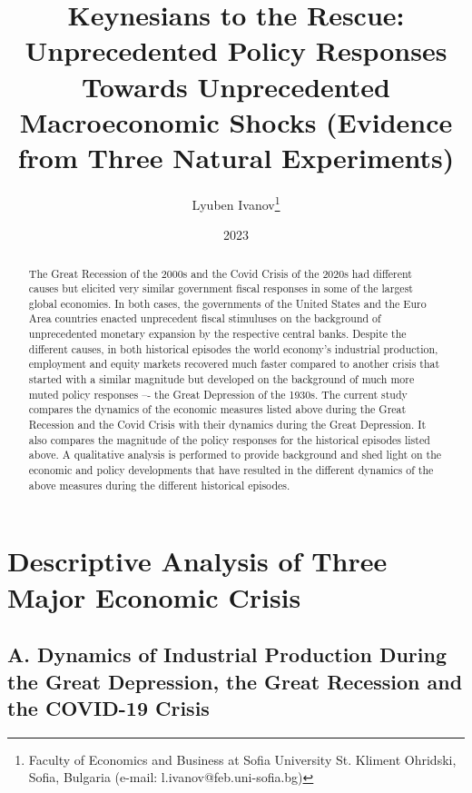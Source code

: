 \documentclass[AER]{AEA}
\begin{document}
\title{Keynesians to the Rescue: Unprecedented Policy Responses Towards Unprecedented Macroeconomic Shocks (Evidence from Three Natural Experiments)}
\author{Lyuben Ivanov\thanks{Faculty of Economics and Business at Sofia University St. Kliment Ohridski\dq, Sofia, Bulgaria (e-mail: l.ivanov@feb.uni-sofia.bg)}}
\date{2023}
\pubVolume{}
\pubIssue{}

\begin{abstract}
The Great Recession of the 2000s and the Covid Crisis of the 2020s had different causes but elicited very similar government fiscal responses in some of the largest global economies. In both cases, the governments of the United States and the Euro Area countries enacted unprecedent fiscal stimuluses on the background of unprecedented monetary expansion by the respective central banks. Despite the different causes, in both historical episodes the world economy’s industrial production, employment and equity markets recovered much faster compared to another crisis that started with a similar magnitude but developed on the background of much more muted policy responses –- the Great Depression of the 1930s.  The current study compares the dynamics of the economic measures listed above during the Great Recession and the Covid Crisis with their dynamics during the Great Depression. It also compares the magnitude of the policy responses for the historical episodes listed above. A qualitative analysis is performed to provide background and shed light on the economic and policy developments that have resulted in the different dynamics of the above measures during the different historical episodes. 
\end{abstract}

\maketitle

\section{Descriptive Analysis of Three Major Economic Crisis}

\subsection*{A. \quad Dynamics of Industrial Production During the Great Depression, the Great Recession and the COVID-19 Crisis} 
\end{document}
